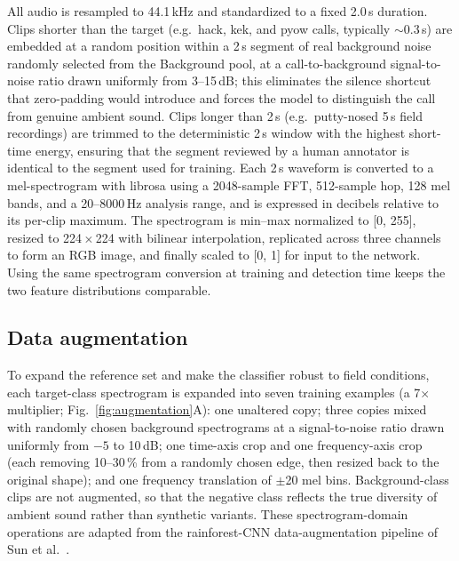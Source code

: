 \documentclass[final,3p,times]{elsarticle}
\begin{document}
All audio is resampled to 44.1\,kHz and standardized to a fixed 2.0\,s
duration. Clips shorter than the target (e.g.\ hack, kek, and pyow calls,
typically $\sim$0.3\,s) are embedded at a random position within a 2\,s
segment of real background noise randomly selected from the Background pool,
at a call-to-background signal-to-noise ratio drawn uniformly from 3--15\,dB;
this eliminates the silence shortcut that zero-padding would introduce and
forces the model to distinguish the call from genuine ambient sound. Clips
longer than 2\,s (e.g.\ putty-nosed 5\,s field recordings) are trimmed to the
deterministic 2\,s window with the highest short-time energy, ensuring that the segment reviewed by a
human annotator is identical to the segment used for training. Each 2\,s
waveform is converted to a mel-spectrogram with librosa \cite{mcfee2015} using
a 2048-sample FFT, 512-sample hop, 128 mel bands, and a 20--8000\,Hz analysis
range, and is expressed in decibels relative to its per-clip maximum. The
spectrogram is min--max normalized to [0, 255], resized to
224\,$\times$\,224 with bilinear interpolation, replicated across three
channels to form an RGB image, and finally scaled to [0, 1] for input to the
network. Using the same spectrogram conversion at training and detection time keeps the
two feature distributions comparable.

\subsection*{Data augmentation}

To expand the reference set and make the classifier robust to field
conditions, each target-class spectrogram is expanded into seven training
examples (a 7$\times$ multiplier; Fig.~\ref{fig:augmentation}A): one unaltered
copy; three copies mixed with
randomly chosen background spectrograms at a signal-to-noise ratio drawn
uniformly from $-5$ to 10\,dB; one time-axis crop and one frequency-axis crop
(each removing 10--30\,\% from a randomly chosen edge, then resized back to the
original shape); and one frequency translation of $\pm$20 mel bins.
Background-class clips are not augmented, so that the negative class reflects
the true diversity of ambient sound rather than synthetic variants. These
spectrogram-domain operations are adapted from the rainforest-CNN
data-augmentation pipeline of Sun et al.\ \cite{sun2022}.
\end{document}
